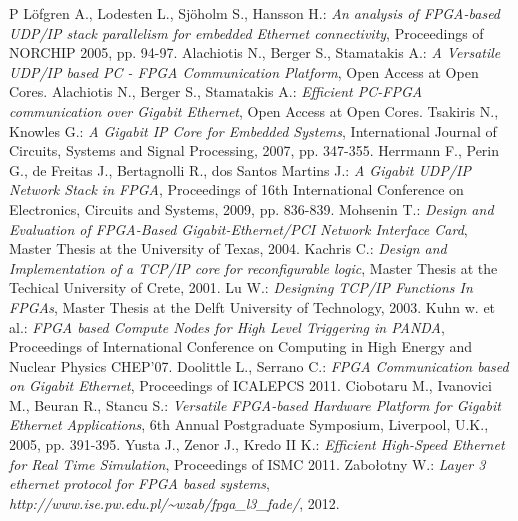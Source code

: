 \documentclass[12pt,a4paper]{article}
\begin{document}
\renewcommand{\refname}{Analyzed literature}
\begin{thebibliography}{99}
P
L\"ofgren A., Lodesten L., Sj\"oholm S., Hansson H.: \emph{An analysis of FPGA-based UDP/IP stack parallelism for embedded Ethernet connectivity},
Proceedings of NORCHIP 2005, pp. 94-97.
Alachiotis N., Berger S., Stamatakis A.: \emph{A Versatile UDP/IP based PC - FPGA Communication Platform},
Open Access at Open Cores.
Alachiotis N., Berger S., Stamatakis A.: \emph{Efficient PC-FPGA communication over Gigabit Ethernet},
Open Access at Open Cores.
Tsakiris N., Knowles G.: \emph{A Gigabit IP Core for Embedded Systems},
International Journal of Circuits, Systems and Signal Processing, 2007, pp. 347-355.
Herrmann F., Perin G., de Freitas J., Bertagnolli R., dos Santos Martins J.: \emph{A Gigabit UDP/IP Network Stack in FPGA},
Proceedings of 16th International Conference on Electronics, Circuits and Systems, 2009, pp. 836-839.
Mohsenin T.: \emph{Design and Evaluation of FPGA-Based Gigabit-Ethernet/PCI Network Interface Card},
Master Thesis at the University of Texas, 2004.
Kachris C.: \emph{Design and Implementation of a TCP/IP core for reconfigurable logic},
Master Thesis at the Techical University of Crete, 2001.
Lu W.: \emph{Designing TCP/IP Functions In FPGAs},
Master Thesis at the Delft University of Technology, 2003.
Kuhn w. et al.: \emph{FPGA based Compute Nodes for High Level Triggering in PANDA},
Proceedings of International Conference on Computing in High Energy and Nuclear Physics CHEP'07.
Doolittle L., Serrano C.: \emph{FPGA Communication based on Gigabit Ethernet},
Proceedings of ICALEPCS 2011.
Ciobotaru M., Ivanovici M., Beuran R., Stancu S.: \emph{Versatile FPGA-based Hardware Platform for Gigabit Ethernet Applications},
6th Annual Postgraduate Symposium, Liverpool, U.K., 2005, pp. 391-395.
Yusta J., Zenor J., Kredo II K.: \emph{Efficient High-Speed Ethernet for Real Time Simulation},
Proceedings of ISMC 2011.
Zabołotny W.: \emph{Layer 3 ethernet protocol for FPGA based systems}, 
\emph{http://www.ise.pw.edu.pl/\~{}wzab/fpga\_l3\_fade/}, 2012.

\end{thebibliography}
\end{document}
